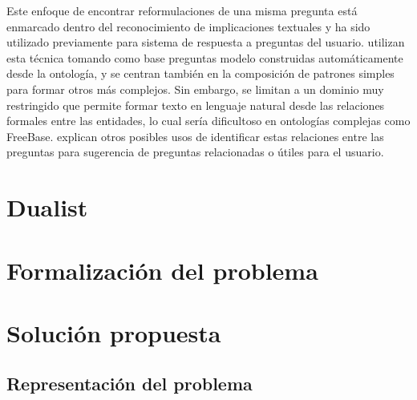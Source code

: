 Este enfoque de encontrar reformulaciones de una misma pregunta está enmarcado dentro del reconocimiento de implicaciones textuales y ha sido utilizado previamente para sistema de respuesta a preguntas del usuario. \citet{ou_entailement} utilizan esta técnica tomando como base preguntas modelo construidas automáticamente desde la ontología, y se centran también en la composición de patrones simples para formar otros más complejos. Sin embargo, se limitan a un dominio muy restringido que permite formar texto en lenguaje natural desde las relaciones formales entre las entidades, lo cual sería dificultoso en ontologías complejas como FreeBase. \citet{rui_relations} explican otros posibles usos de identificar estas relaciones entre las preguntas para sugerencia de preguntas relacionadas o útiles para el usuario.


\section{Dualist}

\section{Formalización del problema}

\section{Solución propuesta}

\subsection{Representación del problema}
